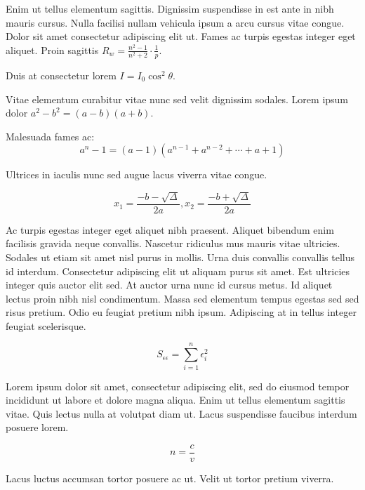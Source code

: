\documentclass{article}
\begin{document}
Enim ut tellus elementum sagittis. Dignissim suspendisse in est ante in nibh mauris cursus. Nulla facilisi nullam vehicula ipsum a arcu cursus vitae congue. Dolor sit amet consectetur adipiscing elit ut. Fames ac turpis egestas integer eget aliquet. Proin sagittis \begin{math}
	R_w=\frac{n^2-1}{n^2+2} \cdot \frac{1}{p}
\end{math}.\newline

Duis at consectetur lorem $ I=I_0\cos ^2\theta $.\newline

Vitae elementum curabitur vitae nunc sed velit dignissim sodales. Lorem ipsum dolor \( a^2-b^2=(a-b)(a+b) \).\newline

Malesuada fames ac: \[ a^n-1=(a-1)(a^{n-1}+a^{n-2}+\cdots+a+1) \]

Ultrices in iaculis nunc sed augue lacus viverra vitae congue.

$$ x_1=\frac{-b-\sqrt{\Delta}}{2a},x_2=\frac{-b+\sqrt{\Delta}}{2a} $$

Ac turpis egestas integer eget aliquet nibh praesent. Aliquet bibendum enim facilisis gravida neque convallis. Nascetur ridiculus mus mauris vitae ultricies. Sodales ut etiam sit amet nisl purus in mollis. Urna duis convallis convallis tellus id interdum. Consectetur adipiscing elit ut aliquam purus sit amet. Est ultricies integer quis auctor elit sed. At auctor urna nunc id cursus metus. Id aliquet lectus proin nibh nisl condimentum. Massa sed elementum tempus egestas sed sed risus pretium. Odio eu feugiat pretium nibh ipsum. Adipiscing at in tellus integer feugiat scelerisque.

\begin{displaymath}
	S_{\epsilon \epsilon}=\sum_{i=1}^{n}\epsilon_i^2
\end{displaymath}

Lorem ipsum dolor sit amet, consectetur adipiscing elit, sed do eiusmod tempor incididunt ut labore et dolore magna aliqua. Enim ut tellus elementum sagittis vitae. Quis lectus nulla at volutpat diam ut. Lacus suspendisse faucibus interdum posuere lorem. 

\begin{equation}
	n=\frac{c}{v}
\end{equation}

Lacus luctus accumsan tortor posuere ac ut. Velit ut tortor pretium viverra.
\end{document}
